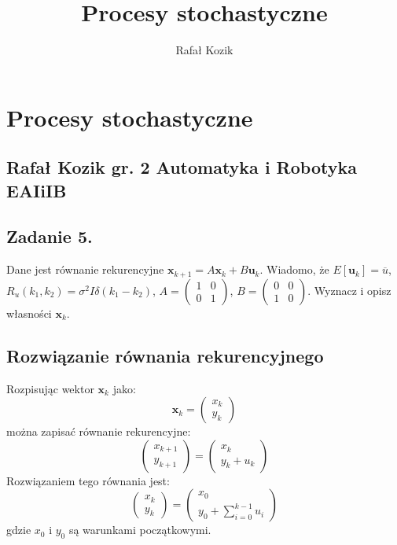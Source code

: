 \documentclass[10pt,a4paper]{article}
\author{Rafał Kozik}
\title{Procesy stochastyczne}
\begin{document}
\section*{Procesy stochastyczne}
\subsection*{Rafał Kozik gr. 2 Automatyka i Robotyka EAIiIB}
	\subsection*{Zadanie 5.}
	Dane jest równanie rekurencyjne $\textbf{x}_{k+1} = A \textbf{x}_k +B \textbf{u}_k$. Wiadomo, że $E[\textbf{u}_k] = \overline{u} $, $R_u(k_1, k_2)= \sigma^2 I \delta (k_1-k_2)$, 
	$A = \left( \begin{smallmatrix} 1&0 \\ 0&1 \end{smallmatrix} \right)$, $B = \left( \begin{smallmatrix} 0&0 \\ 1&0 \end{smallmatrix} \right)$. Wyznacz i opisz własności $\textbf{x}_k$.

\subsection*{Rozwiązanie równania rekurencyjnego}
Rozpisując wektor $\textbf{x}_k$ jako:
\begin{equation}
	\textbf{x}_k = \left( \begin{smallmatrix}
	 x_k \\ y_k
	\end{smallmatrix} \right)
\end{equation}	  
można zapisać równanie rekurencyjne:
\begin{equation}
	\left(
	\begin{matrix}
		x_{k+1}\\
		y_{k+1}		
	\end{matrix}
	\right) = 
	\left(
	\begin{matrix}
		x_{k}\\
		y_{k}+u_k		
	\end{matrix}
	\right)
\end{equation}
Rozwiązaniem tego równania jest:
\begin{equation}
	\left(
	\begin{matrix}
		x_k \\ y_k
	\end{matrix}
	\right) 
	 =
	\left(
	\begin{matrix}
		x_0 \\ y_0 + \sum\limits_{i=0}^{k-1}u_i
	\end{matrix}
	\right) 
\end{equation}
gdzie $x_0$ i $y_0$ są warunkami początkowymi.
\end{document}

